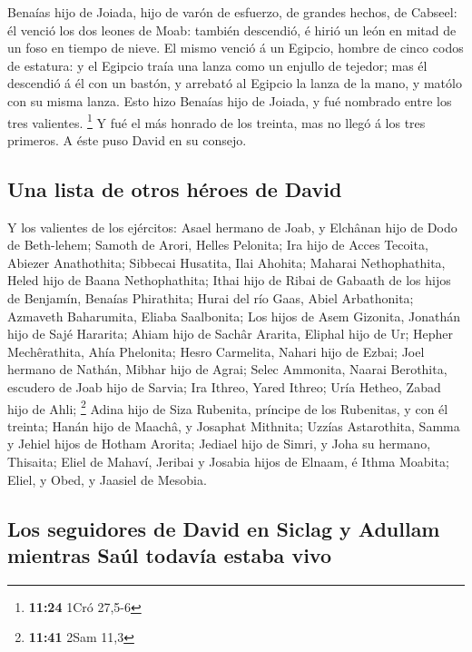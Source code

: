  Benaías hijo de Joiada, hijo de varón de esfuerzo, de
grandes hechos, de Cabseel: él venció los dos leones de Moab: también
descendió, é hirió un león en mitad de un foso en tiempo de nieve.
 El mismo venció á un Egipcio, hombre de cinco codos de
estatura: y el Egipcio traía una lanza como un enjullo de tejedor; mas
él descendió á él con un bastón, y arrebató al Egipcio la lanza de la
mano, y matólo con su misma lanza.  Esto hizo Benaías hijo
de Joiada, y fué nombrado entre los tres valientes. \footnote{\textbf{11:24}
  1Cró 27,5-6}  Y fué el más honrado de los treinta, mas no
llegó á los tres primeros. A éste puso David en su consejo.

\hypertarget{una-lista-de-otros-huxe9roes-de-david}{%
\subsection{Una lista de otros héroes de
David}\label{una-lista-de-otros-huxe9roes-de-david}}

 Y los valientes de los ejércitos: Asael hermano de Joab, y
Elchânan hijo de Dodo de Beth-lehem;  Samoth de Arori,
Helles Pelonita;  Ira hijo de Acces Tecoita, Abiezer
Anathothita;  Sibbecai Husatita, Ilai Ahohita;
 Maharai Nethophathita, Heled hijo de Baana Nethophathita;
 Ithai hijo de Ribai de Gabaath de los hijos de Benjamín,
Benaías Phirathita;  Hurai del río Gaas, Abiel Arbathonita;
 Azmaveth Baharumita, Eliaba Saalbonita;  Los
hijos de Asem Gizonita, Jonathán hijo de Sajé Hararita; 
Ahiam hijo de Sachâr Ararita, Eliphal hijo de Ur;  Hepher
Mechêrathita, Ahía Phelonita;  Hesro Carmelita, Nahari hijo
de Ezbai;  Joel hermano de Nathán, Mibhar hijo de Agrai;
 Selec Ammonita, Naarai Berothita, escudero de Joab hijo de
Sarvia;  Ira Ithreo, Yared Ithreo;  Uría
Hetheo, Zabad hijo de Ahli; \footnote{\textbf{11:41} 2Sam 11,3}
 Adina hijo de Siza Rubenita, príncipe de los Rubenitas, y
con él treinta;  Hanán hijo de Maachâ, y Josaphat Mithnita;
 Uzzías Astarothita, Samma y Jehiel hijos de Hotham
Arorita;  Jediael hijo de Simri, y Joha su hermano,
Thisaita;  Eliel de Mahaví, Jeribai y Josabia hijos de
Elnaam, é Ithma Moabita;  Eliel, y Obed, y Jaasiel de
Mesobia.

\hypertarget{los-seguidores-de-david-en-siclag-y-adullam-mientras-sauxfal-todavuxeda-estaba-vivo}{%
\subsection{Los seguidores de David en Siclag y Adullam mientras Saúl
todavía estaba
vivo}\label{los-seguidores-de-david-en-siclag-y-adullam-mientras-sauxfal-todavuxeda-estaba-vivo}}

